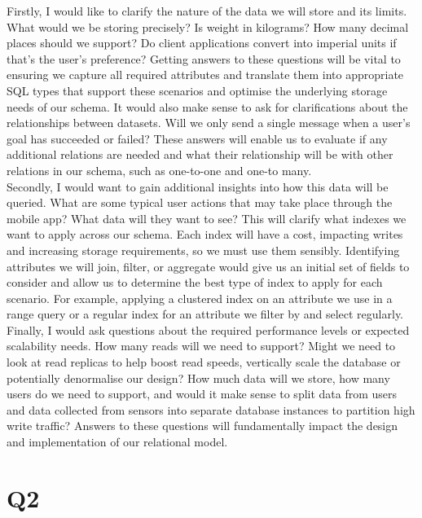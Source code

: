 \documentclass{article}
\begin{document}
Firstly, I would like to clarify the nature of the data we will store and its limits. What would we be storing precisely? Is weight in kilograms? How many decimal places should we support? Do client applications convert into imperial units if that's the user's preference? Getting answers to these questions will be vital to ensuring we capture all required attributes and translate them into appropriate SQL types that support these scenarios and optimise the underlying storage needs of our schema. It would also make sense to ask for clarifications about the relationships between datasets. Will we only send a single message when a user's goal has succeeded or failed? These answers will enable us to evaluate if any additional relations are needed and what their relationship will be with other relations in our schema, such as one-to-one and one-to many. \\
\newline
Secondly, I would want to gain additional insights into how this data will be queried. What are some typical user actions that may take place through the mobile app? What data will they want to see? This will clarify what indexes we want to apply across our schema. Each index will have a cost, impacting writes and increasing storage requirements, so we must use them sensibly. Identifying attributes we will join, filter, or aggregate would give us an initial set of fields to consider and allow us to determine the best type of index to apply for each scenario. For example, applying a clustered index on an attribute we use in a range query or a regular index for an attribute we filter by and select regularly. \\
\newline
Finally, I would ask questions about the required performance levels or expected scalability needs. How many reads will we need to support? Might we need to look at read replicas to help boost read speeds, vertically scale the database or potentially denormalise our design? How much data will we store, how many users do we need to support, and would it make sense to split data from users and data collected from sensors into separate database instances to partition high write traffic? Answers to these questions will fundamentally impact the design and implementation of our relational model. \\
\pagebreak

\section*{Q2}
\end{document}
